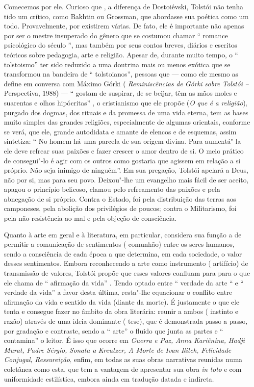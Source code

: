 Comecemos por ele. Curioso que , a diferença de Dostoiévski, Tolstói não
tenha tido um crítico, como Bakhtin ou Grossman, que abordasse sua
poética como um todo. Provavelmente, por existirem várias. De fato, ele
é importante não apenas por ser o mestre insuperado do gênero que se
costumou chamar `` romance psicológico do século '', mas também por
seus contos breves, diários e escritos teóricos sobre pedagogia, arte e
religião. Apesar de, durante muito tempo, o `` tolstoismo'' ter sido
reduzido a uma doutrina mais ou menos exótica que se transformou na
bandeira de `` tolstoianos'', pessoas que --- como ele mesmo as define em
conversa com Máximo Górki ( \emph{Reminiscências de Górki sobre Tolstói
--} Perspectiva, 1988) --- `` gostam de suspirar, de se beijar, têm as
mãos moles e suarentas e olhos hipócritas'' , o cristianismo que ele
propõe (\emph{O que é a religião}), purgado dos dogmas, dos rituais e da
promessa de uma vida eterna, tem as bases muito simples das grandes
religiões, especialmente de algumas orientais, conforme se verá, que
ele, grande autodidata e amante de elencos e de esquemas, assim
sintetiza: `` No homem há uma parcela de sua origem divina. Para
aumentá"-la ele deve refrear suas paixões e fazer crescer o amor dentro
de si. O meio prático de consegui"-lo é agir com os outros como gostaria
que agissem em relação a si próprio. Não seja inimigo de ninguém''. Em
sua pregação, Tolstói apelará a Deus, não por si, mas para seu povo.
Deixou"-lhe um evangelho mais fácil de ser aceito, apagou o princípio
belicoso, clamou pelo refreamento das paixões e pela abnegação de si
próprio. Contra o Estado, foi pela distribuição das terras aos
camponeses, pela abolição dos privilégios de poucos; contra o
Militarismo, foi pela não resistência ao mal e pela objeção de
consciência.

Quanto à arte em geral e à literatura, em particular, considera sua
função a de permitir a comunicação de sentimentos ( comunhão) entre os
seres humanos, sendo a consciência de cada época a que determina, em
cada sociedade, o valor desses sentimentos. Embora reconhecendo a arte
como instrumento ( artifício) de transmissão de valores, Tolstói propõe
que esses valores confluam para para o que ele chama de `` afirmação da
vida'' . Tendo optado entre `` verdade da arte `` e `` verdade da vida''
a favor desta última, resta"-lhe equacionar o conflito entre afirmação da
vida e sentido da vida (diante da morte). É justamente o que ele tenta e
consegue fazer no âmbito da obra literária: reunir a ambos ( instinto e
razão) através de uma ideia dominante ( tese), que é demonstrada passo a
passo, por gradação e contraste, sendo a `` arte'' o fluido que junta as
partes e `` contamina'' o leitor. É isso que ocorre em \emph{Guerra e
Paz, Anna Kariênina, Hadji Murat, Padre Sérgio, Sonata a Kreutzer, A
Morte de Ivan Ilitch, Felicidade Conjugal, Ressureição}, enfim, em todas
as suas obras narrativas reunidas numa coletânea como esta, que tem a
vantagem de apresentar sua obra \emph{in toto} e com uniformidade
estilística, embora ainda em tradução datada e indireta.

